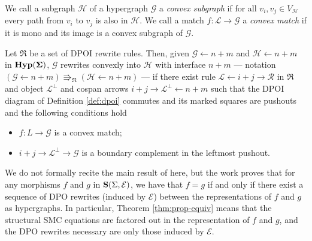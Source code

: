 \begin{definition}
We call a subgraph $\mathcal{H}$ of a hypergraph $\mathcal{G}$ a \emph{convex subgraph} if for all $v_i, v_j \in V_{\mathcal{H}}$ every path from $v_i$ to $v_j$ is also in $\mathcal{H}$.
We call a match $f : \mathcal L \to \mathcal G$ a \emph{convex match} if it is mono and its image is a convex subgraph of $\mathcal G$. 
   
\end{definition}

\begin{definition}
\label{def:convex_dpo}
Let $\mathfrak{R}$ be a set of DPOI rewrite rules. 
Then, given $\mathcal G \xleftarrow{} n+m$ and $\mathcal H \xleftarrow{} n + m$ in $\mathbf{Hyp(\Sigma)}$, $\mathcal G$ rewrites convexly into $\mathcal H$ with interface $n + m$ --- notation $(\mathcal G \xleftarrow{} n + m ) \Rrightarrow_{\mathfrak{R}}  (\mathcal H \xleftarrow{} n + m )$ --- if there exist rule $\mathcal L \xleftarrow{} i + j \xrightarrow{} \mathcal R$ in $\mathfrak{R}$ and object $\mathcal{L}^{\bot}$ and cospan arrows $i+j \xrightarrow{} \mathcal{L}^{\bot} \xleftarrow{} n+m$ such that the DPOI diagram of Definition \ref{def:dpoi} commutes and its marked squares are pushouts 
and the following conditions hold
\begin{itemize}
    \item $f : L \to \mathcal G$ is a convex match;
    \item $i + j \to \mathcal{L}^{\bot} \to \mathcal G$ is a boundary complement in the leftmost pushout.
\end{itemize}
\end{definition}
We do not formally recite the main result of \cite{bonchi_string_2022-2} here,  but the work proves that for any morphisms $f$ and $g$ in $\mathbf{S}(\Sigma, \mathcal{E})$,  we have that $f = g$ if and only if there exist a sequence of DPO rewrites (induced by $\mathcal{E}$) between the representations of $f$ and $g$ as hypergraphs.  In particular,  Theorem \ref{thm:prop-equiv} means that the structural SMC equations are factored out in the representation of $f$ and $g$,  and the DPO rewrites necessary are only those induced by $\mathcal{E}$. 
